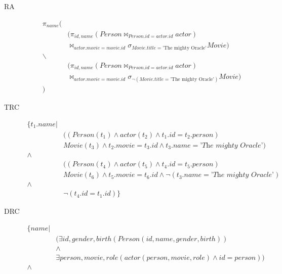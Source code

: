 \documentclass[11pt,a4paper,DIV=9]{scrartcl}
\begin{document}
        \begin{description}
          \item [RA]  \begin{align*}
                        \pi_{name} (&\\
                            &(\pi_{id,name}(Person\Join_{Person.id = actor.id}actor)\\
                            &\Join_{actor.movie = movie.id}\sigma_{Movie.title=\textrm{'The mighty Oracle'}}Movie)\\
                         \backslash &\\
                            &(\pi_{id,name}(Person\Join_{Person.id = actor.id}actor)\\
                            &\Join_{actor.movie = movie.id}\sigma_{\neg(Movie.title=\textrm{'The mighty Oracle'})}Movie)\\
                        )
                      \end{align*}
          \item [TRC] \begin{align*}
                      \{ t_1.name | & \\
                      & ((Person(t_1) \wedge actor(t_2) \wedge t_1.id=t_2.person) \\
                      & Movie(t_3) \wedge t_2.movie = t_3.id \wedge t_3.name=\textit{'The mighty Oracle'})\\
                      \wedge\\
                      & ((Person(t_4) \wedge actor(t_5) \wedge t_4.id=t_5.person) \\
                      & Movie(t_6) \wedge t_5.movie = t_6.id \wedge \neg(t_3.name=\textit{'The mighty Oracle'})\\
                      \wedge \\
                     & \neg(t_4.id = t_1.id)
                      \}
                      \end{align*}
          \item [DRC] \begin{align*}
                      \{ name | & \\
                      & (\exists id, gender, birth (Person(id, name, gender, birth))\\
                      &\wedge \\
                      & \exists person,movie,role(actor(person, movie, role) \wedge id = person))\\
                      \wedge &\\

\end{align*}
\end{description}
\end{document}
